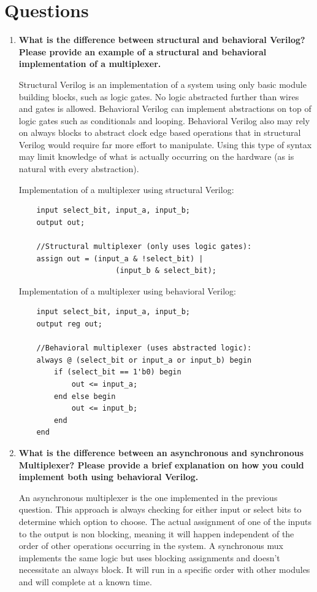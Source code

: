 \documentclass[11pt]{article}
\begin{document}
\section{Questions}
\begin{enumerate}
	\item \textbf{What is the difference between structural and behavioral Verilog? Please provide an example of a structural and behavioral implementation of a multiplexer.} 
	
	Structural Verilog is an implementation of a system using only basic module building blocks, such as logic gates. No logic abstracted further than wires and gates is allowed. Behavioral Verilog can implement abstractions on top of logic gates such as conditionals and looping. Behavioral Verilog also may rely on always blocks to abstract clock edge based operations that in structural Verilog would require far more effort to manipulate. Using this type of syntax may limit knowledge of what is actually occurring on the hardware (as is natural with every abstraction).
	
	Implementation of a multiplexer using structural Verilog:
	
	\begin{lstlisting}
	input select_bit, input_a, input_b;
	output out;
	
	//Structural multiplexer (only uses logic gates):
	assign out = (input_a & !select_bit) | 
	                  (input_b & select_bit);
	\end{lstlisting}
	
	Implementation of a multiplexer using behavioral Verilog:
	
	\begin{lstlisting}
	input select_bit, input_a, input_b;
	output reg out;
	
	//Behavioral multiplexer (uses abstracted logic):	
	always @ (select_bit or input_a or input_b)	begin
		if (select_bit == 1'b0) begin
			out <= input_a;
		end else begin
			out <= input_b;
		end
	end
	\end{lstlisting}
	
	\item \textbf{What is the difference between an asynchronous and synchronous Multiplexer? Please provide a brief explanation on how you could implement both using behavioral Verilog.}
	
	An asynchronous multiplexer is the one implemented in the previous question. This approach is always checking for either input or select bits to determine which option to choose. The actual assignment of one of the inputs to the output is non blocking, meaning it will happen independent of the order of other operations occurring in the system. A synchronous mux implements the same logic but uses blocking assignments and doesn't necessitate an always block. It will run in a specific order with other modules and will complete at a known time. 
	

\end{enumerate}
\end{document}

